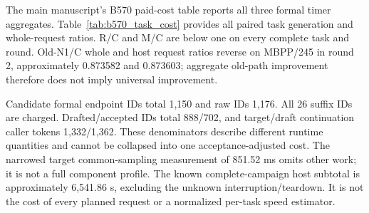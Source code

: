 The main manuscript's B570 paid-cost table reports all three formal timer aggregates. Table~\ref{tab:b570_task_cost} provides all paired task generation and whole-request ratios. R/C and M/C are below one on every complete task and round. Old-N1/C whole and host request ratios reverse on MBPP/245 in round 2, approximately 0.873582 and 0.873603; aggregate old-path improvement therefore does not imply universal improvement.



Candidate formal endpoint IDs total 1,150 and raw IDs 1,176. All 26 suffix IDs are charged. Drafted/accepted IDs total 888/702, and target/draft continuation caller tokens 1,332/1,362. These denominators describe different runtime quantities and cannot be collapsed into one acceptance-adjusted cost. The narrowed target common-sampling measurement of 851.52 ms omits other work; it is not a full component profile. The known complete-campaign host subtotal is approximately 6,541.86 s, excluding the unknown interruption/teardown. It is not the cost of every planned request or a normalized per-task speed estimator.

